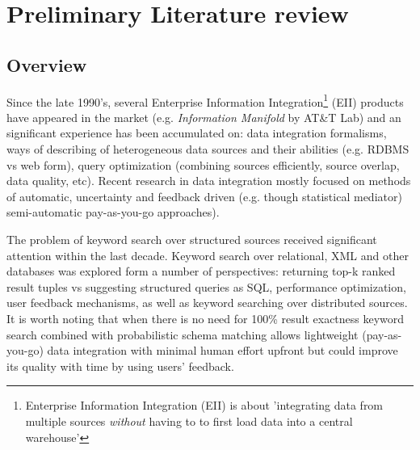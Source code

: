 \section{Preliminary Literature review}


\subsection{Overview}


Since the late 1990's, several Enterprise Information Integration\footnote{%
	Enterprise Information Integration (EII) is about 'integrating data from 
	multiple sources 	\textit{without} having to to first load data into
	 a central warehouse'\cite[p.1]{eii_2005}}
 (EII) products have appeared in the market (e.g. \textit{Information Manifold} by AT\&T Lab) and an significant experience has been accumulated on: data integration formalisms, ways of describing of heterogeneous data sources and their abilities (e.g. RDBMS vs web form), query optimization (combining sources efficiently, source overlap, data quality, etc)\cite{eii_2005}. 
%
Recent research in data integration mostly focused on methods of automatic, uncertainty and feedback  driven (e.g. though statistical mediator) semi-automatic pay-as-you-go approaches\cite[ch.19]{principles_data_integration}).


The problem of keyword search over structured sources received significant attention within the last decade. Keyword search over relational, XML and other databases was explored form a number of perspectives: returning top-k ranked result tuples vs suggesting structured queries as SQL, performance optimization, user feedback mechanisms, as well as keyword searching over distributed sources. 
It is worth noting that when there is no need for 100\% result exactness keyword search combined with probabilistic schema matching allows lightweight (pay-as-you-go) data integration with minimal human effort upfront\cite[ch.16]{principles_data_integration} but could improve its quality with time by using users' feedback.


